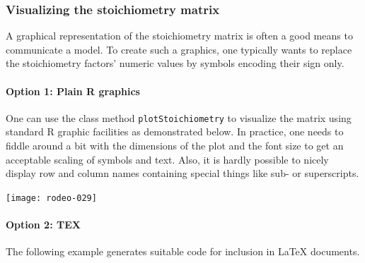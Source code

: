 \documentclass[times,onecolumn]{article}
\begin{document}
\subsubsection{Visualizing the stoichiometry matrix} \label{sec:advanced:doc:stoi}

A graphical representation of the stoichiometry matrix is often a good means to communicate a model. To create such a graphics, one typically wants to replace the stoichiometry factors' numeric values by symbols encoding their sign only.

\paragraph{Option 1: Plain R graphics}
One can use the class method \verb|plotStoichiometry| to visualize the matrix using standard R graphic facilities as demonstrated below. In practice, one needs to fiddle around a bit with the dimensions of the plot and the font size to get an acceptable scaling of symbols and text. Also, it is hardly possible to nicely display row and column names containing special things like sub- or superscripts.

\begin{Schunk}
\end{Schunk}
\texttt{[image: rodeo-029]}

\paragraph{Option 2: TEX}
The following example generates suitable code for inclusion in \LaTeX{} documents.
\end{document}
